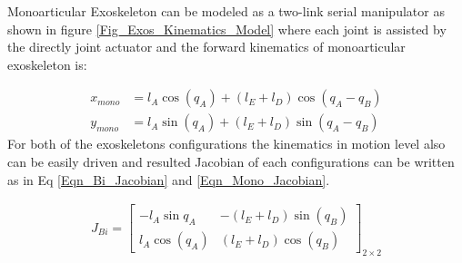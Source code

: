 \documentclass[10pt,letterpaper]{article}
\begin{document}
Monoarticular Exoskeleton can be modeled as a two-link serial manipulator as shown in figure \ref{Fig_Exos_Kinematics_Model} where each joint is assisted by the directly joint actuator and the forward kinematics of monoarticular exoskeleton is:

\begin{align}\label{Eqn_Mono_Kin}
x_{mono} &= l_ {A}\cos (q_ {A}) + (l_ {E} + l_ {D})\cos (q_ {A} - q_ {B})\\
y_{mono} &= l_ {A}\sin (q_ {A}) + (l_ {E} + l_ {D})\sin (q_ {A} - q_ {B})
\end{align}
For both of the exoskeletons configurations the kinematics in motion level also can be easily driven and resulted Jacobian of each configurations can be written as in Eq \eqref{Eqn_Bi_Jacobian} and \eqref{Eqn_Mono_Jacobian}.

\begin{gather}\label{Eqn_Bi_Jacobian}
J_{Bi} =
\begin{bmatrix}
-l_{A}\sin{q_{A}}  & -(l_ {E} + l_ {D})\sin (q_ {B})\\
l_ {A}\cos (q_{A}) &  (l_ {E} + l_ {D})\cos (q_ {B})
\end{bmatrix}_{2 \times 2}
\end{gather}
\end{document}
